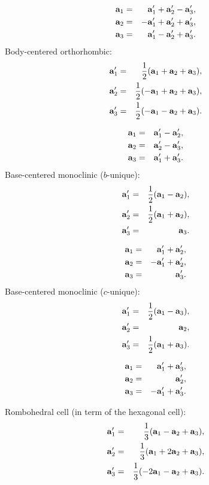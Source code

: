 \documentclass[12pt,a4paper,twoside]{report}
\begin{document}
\begin{eqnarray}
{\bf a}_1&=&  {\bf a}_1' + {\bf a}_2' - {\bf a}_3', \\
{\bf a}_2&=& -{\bf a}_1' + {\bf a}_2' + {\bf a}_3', \\
{\bf a}_3&=&  {\bf a}_1' - {\bf a}_2' + {\bf a}_3'.
\end{eqnarray}
Body-centered orthorhombic:
\begin{eqnarray}
{\bf a}_1'&=&{1\over 2} ({\bf a}_1 + {\bf a}_2 + {\bf a}_3), \\
{\bf a}_2'&=&{1\over 2} (-{\bf a}_1 + {\bf a}_2 + {\bf a}_3), \\
{\bf a}_3'&=&{1\over 2} (-{\bf a}_1 - {\bf a}_2 + {\bf a}_3). 
\end{eqnarray}

\begin{eqnarray}
{\bf a}_1&=&  {\bf a}_1' - {\bf a}_2', \\
{\bf a}_2&=&  {\bf a}_2' - {\bf a}_3', \\
{\bf a}_3&=& {\bf a}_1' + {\bf a}_3'.
\end{eqnarray}
Base-centered monoclinic ($b$-unique):
\begin{eqnarray}
{\bf a}_1'&=&{1\over 2} ({\bf a}_1 - {\bf a}_2), \\
{\bf a}_2'&=&{1\over 2} ({\bf a}_1 + {\bf a}_2), \\
{\bf a}_3'&=&{\bf a}_3. 
\end{eqnarray}

\begin{eqnarray}
{\bf a}_1&=&  {\bf a}_1' + {\bf a}_2', \\
{\bf a}_2&=& -{\bf a}_1' + {\bf a}_2', \\
{\bf a}_3&=& {\bf a}_3'.
\end{eqnarray}
Base-centered monoclinic ($c$-unique):
\begin{eqnarray}
{\bf a}_1'&=&{1\over 2} ({\bf a}_1 - {\bf a}_3), \\
{\bf a}_2'&=&{\bf a}_2, \\
{\bf a}_3'&=&{1\over 2} ({\bf a}_1 + {\bf a}_3). 
\end{eqnarray}

\begin{eqnarray}
{\bf a}_1&=& {\bf a}_1' + {\bf a}_3', \\
{\bf a}_2&=& {\bf a}_2', \\
{\bf a}_3&=& -{\bf a}_1' + {\bf a}_3'.
\end{eqnarray}

Rombohedral cell (in term of the hexagonal cell):
\begin{eqnarray}
{\bf a}_1'&=&{1\over 3} ({\bf a}_1 - {\bf a}_2 + {\bf a}_3), \\
{\bf a}_2'&=&{1\over 3} ({\bf a}_1 + 2 {\bf a}_2 + {\bf a}_3), \\
{\bf a}_3'&=&{1\over 3} (-2 {\bf a}_1 - {\bf a}_2 + {\bf a}_3). 
\end{eqnarray}
\end{document}
